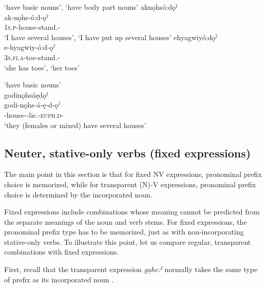 \ea\label{ex:posownex8}  ‘have basic nouns’,  ‘have body part nouns’
\ea aknǫhsó:dǫˀ \\
\gll ak-nǫhs-ó:d-ǫˀ\\
 \textsc{1s.p}-house-stand.{\stat}-{\distributive} \\
\glt ‘I have several houses’, `I have put up several houses'
\ex ehyagwiyó:dǫˀ \\
\gll e-hyagwiy-ó:d-ǫˀ\\
 \textsc{3s.fi.a}-toe-stand.{\stat}-{\distributive}\\
\glt ‘she has toes’, `her toes'
\z
\z

\ea\label{ex:posownex7}  ‘have basic nouns’\\
godinǫhsáędǫˀ\\
\gll godi-nǫhs-á-ę-d-ǫˀ\\
 -house-{\joinerA}-lie.{\stative}-\textsc{euph.d}-\exsc{\distributive}\\
\glt `they (females or mixed) have several houses'
\z


\subsection{Neuter, stative-only verbs (fixed expressions)} \label{Neuter, stative-only verbs (fixed expressions)}
The main point in this section is that for fixed NV expressions, pronominal prefix choice is memorized, while for transparent (N)-V expressions, pronominal prefix choice is determined by the incorporated noun. 

Fixed expressions include  combinations whose meaning cannot be predicted from the separate meanings of the noun and verb stems. For fixed expressions, the pronominal prefix type has to be memorized, just as with non-incorporating stative-only verbs. To illustrate this point, let us compare regular, transparent  combinations with fixed  expressions.

First, recall that the transparent expression \textit{ga̱he:ˀ} normally takes the same type of prefix as its incorporated noun .

